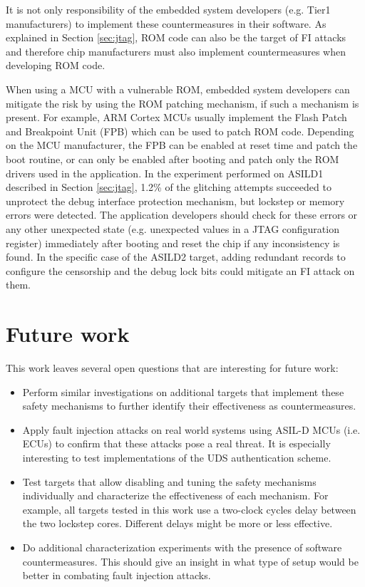 \documentclass[10pt, conference, compsocconf]{IEEEtran}
\newcommand{\TI}{ASILD1\xspace}
\newcommand{\ST}{ASILD2\xspace}
\begin{document}
It is not only responsibility of the embedded system developers (e.g. Tier1 manufacturers) to implement these countermeasures in their software. As explained in Section \ref{sec:jtag}, ROM code can also be the target of FI attacks and therefore chip manufacturers must also implement countermeasures when developing ROM code. 

When using a MCU with a vulnerable ROM, embedded system developers can mitigate the risk by using the ROM patching mechanism, if such a mechanism is present. For example, ARM Cortex MCUs usually implement the Flash Patch and Breakpoint Unit (FPB) which can be used to patch ROM code. Depending on the MCU manufacturer, the FPB can be enabled at reset time and patch the boot routine, or can only be enabled after booting and patch only the ROM drivers used in the application. In the experiment performed on \TI described in Section \ref{sec:jtag}, 1.2\% of the glitching attempts succeeded to unprotect the debug interface protection mechanism, but lockstep or memory errors were detected. The application developers should check for these errors or any other unexpected state (e.g. unexpected values in a JTAG configuration register) immediately after booting and reset the chip if any inconsistency is found. 
In the specific case of the \ST target, adding redundant records to configure the censorship and the debug lock bits could mitigate an FI attack on them.


\section{Future work}
This work leaves several open questions that are interesting for future work:

\begin{itemize}
  \item Perform similar investigations on additional targets that implement these safety mechanisms to further identify their effectiveness as countermeasures.
    \item Apply fault injection attacks on real world systems using ASIL-D MCUs (i.e. ECUs) to confirm that these attacks pose a real threat. It is especially interesting to test implementations of the UDS authentication scheme. 
    \item Test targets that allow disabling and tuning the safety mechanisms individually and characterize the effectiveness of each mechanism. For example, all targets tested in this work use a two-clock cycles delay between the two lockstep cores. Different delays might be more or less effective.
    \item Do additional characterization experiments with the presence of software countermeasures. This should give an insight in what type of setup would be better in combating fault injection attacks.
\end{itemize}
\end{document}
